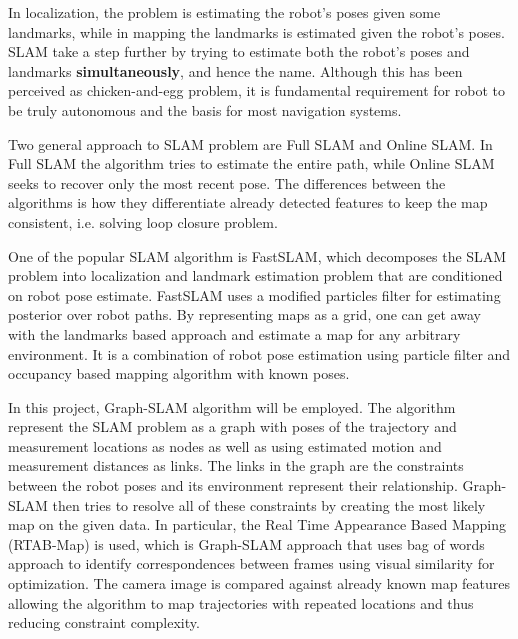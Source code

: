 \documentclass[10pt,journal,compsoc]{IEEEtran}
\begin{document}
In localization, the problem is estimating the robot's poses given some landmarks, while in mapping the landmarks is estimated given the robot's poses. SLAM take a step further by trying to estimate both the robot's poses and landmarks \textbf{simultaneously}, and hence the name.  Although this has been perceived as chicken-and-egg problem, it is fundamental requirement for robot to be truly autonomous and the basis for most navigation systems.

Two general approach to SLAM problem are Full SLAM and Online SLAM.  In Full SLAM the algorithm tries to estimate the entire path, while Online SLAM seeks to recover only the most recent pose.  The differences between the algorithms is how they differentiate already detected features to keep the map consistent, i.e. solving loop closure problem.

One of the popular SLAM algorithm is FastSLAM, which decomposes the SLAM problem into localization and landmark estimation problem that are conditioned on robot pose estimate. FastSLAM uses a modified particles filter for estimating posterior over robot paths.  By representing maps as a grid, one can get away with the landmarks based approach and estimate a map for any arbitrary environment. It is a combination of robot pose estimation using particle filter and occupancy based mapping algorithm with known poses.

In this project, Graph-SLAM algorithm will be employed.  The algorithm represent the SLAM problem as a graph with poses of the trajectory and measurement locations as nodes as well as using estimated motion and measurement distances as links. The links in the graph are the constraints between the robot poses and its environment represent their relationship. Graph-SLAM then tries to resolve all of these constraints by creating the most likely map on the given data. In particular, the Real Time Appearance Based Mapping (RTAB-Map) is used, which is Graph-SLAM approach that uses bag of words approach to identify correspondences between frames using visual similarity for optimization. The camera image is compared against already known map features allowing the algorithm to map trajectories with repeated locations and thus reducing constraint complexity.
\end{document}
